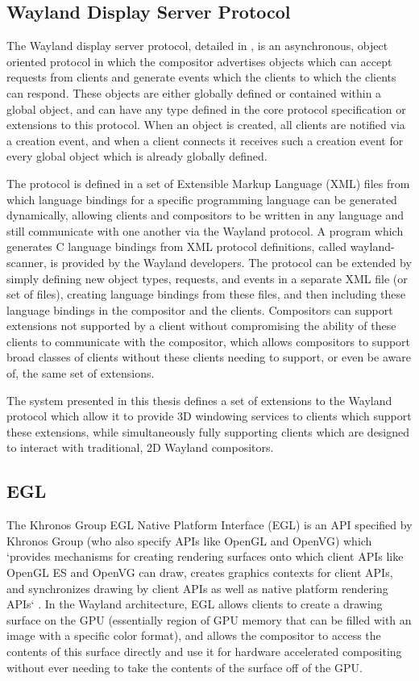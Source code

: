 \subsection{Wayland Display Server Protocol}
\label{sec:wayland-protocol}

The Wayland display server protocol, detailed in \cite{wayland-protocol}, is an asynchronous, object oriented protocol in which the compositor advertises objects which can accept requests from clients and generate events which the clients to which the clients can respond. These objects are either globally defined or contained within a global object, and can have any type defined in the core protocol specification or extensions to this protocol. When an object is created, all clients are notified via a creation event, and when a client connects it receives such a creation event for every global object which is already globally defined.

The protocol is defined in a set of Extensible Markup Language (XML) files from which language bindings for a specific programming language can be generated dynamically, allowing clients and compositors to be written in any language and still communicate with one another via the Wayland protocol. A program which generates C language bindings from XML protocol definitions, called wayland-scanner, is provided by the Wayland developers. The protocol can be extended by simply defining new object types, requests, and events in a separate XML file (or set of files), creating language bindings from these files, and then including these language bindings in the compositor and the clients. Compositors can support extensions not supported by a client without compromising the ability of these clients to communicate with the compositor, which allows compositors to support broad classes of clients without these clients needing to support, or even be aware of, the same set of extensions.

The system presented in this thesis defines a set of extensions to the Wayland protocol which allow it to provide 3D windowing services to clients which support these extensions, while simultaneously fully supporting clients which are designed to interact with traditional, 2D Wayland compositors.

\subsection{EGL}
\label{sec:egl}

The Khronos Group EGL Native Platform Interface (EGL) \cite{egl} is an API specified by Khronos Group (who also specify APIs like OpenGL and OpenVG) which `provides mechanisms for creating rendering surfaces onto which client APIs like OpenGL ES and OpenVG can draw, creates graphics contexts for client APIs, and synchronizes drawing by client APIs as well as native platform rendering APIs` \cite{egl}. In the Wayland architecture, EGL allows clients to create a drawing surface on the GPU (essentially region of GPU memory that can be filled with an image with a specific color format), and allows the compositor to access the contents of this surface directly  and use it for hardware accelerated compositing without ever needing to take the contents of the surface off of the GPU. 

